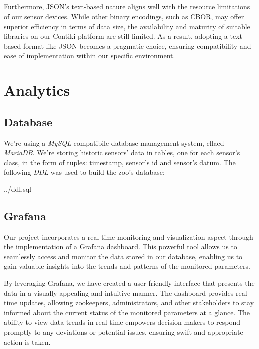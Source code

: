 \documentclass[parskip=full]{report}
\begin{document}
\paragraph{}
Furthermore, JSON's text-based nature aligns well with the resource limitations of our sensor devices. While other binary encodings, such as CBOR, may offer superior efficiency in terms of data size, the availability and maturity of suitable libraries on our Contiki platform are still limited. As a result, adopting a text-based format like JSON becomes a pragmatic choice, ensuring compatibility and ease of implementation within our specific environment.
\chapter{Analytics}

\section{Database}

We're using a \textit{MySQL}-compatibile database management system, cllaed \textit{MariaDB}. We're storing historic sensors' data in tables, one for each sensor's class, in the form of tuples: timestamp, sensor's id and sensor's datum. The following \textit{DDL} was used to build the zoo's database:


{../ddl.sql}

\section{Grafana}

Our project incorporates a real-time monitoring and visualization aspect through the implementation of a Grafana dashboard. This powerful tool allows us to seamlessly access and monitor the data stored in our database, enabling us to gain valuable insights into the trends and patterns of the monitored parameters.

By leveraging Grafana, we have created a user-friendly interface that presents the data in a visually appealing and intuitive manner. The dashboard provides real-time updates, allowing zookeepers, administrators, and other stakeholders to stay informed about the current status of the monitored parameters at a glance. The ability to view data trends in real-time empowers decision-makers to respond promptly to any deviations or potential issues, ensuring swift and appropriate action is taken.
\end{document}
